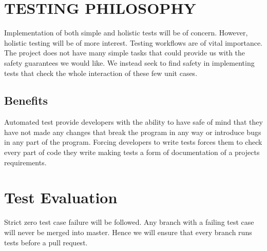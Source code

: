 \documentclass[12pt]{article}
\begin{document}
  \section{TESTING PHILOSOPHY}
  Implementation of both simple and holistic tests will be of concern. However, holistic testing will be of more interest. Testing workflows are of vital importance. The project does not have many simple tasks that could provide us with the safety guarantees we would like. We instead seek to find safety in implementing tests that check the whole interaction of these few unit cases.
  
  \subsection{Benefits}
  Automated test provide developers with the ability to have safe of mind that they have not made any changes that break the program in any way or introduce bugs in any part of the program.
  Forcing developers to write tests forces them to check every part of code they write making tests a form of documentation of a projects requirements.
  
  \section{Test Evaluation}
  Strict zero test case failure will be followed. Any branch with a failing test case will never be merged into master. Hence we will ensure that every branch runs tests before a pull request.
  
\end{document}
